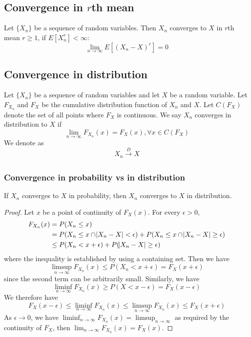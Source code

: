 \begin{refsection}
\subsection{Convergence in $r$th mean}
\begin{definition}\cite[308]{grimmett2001probability}
Let $\{X_n\}$ be a sequence of random variables. Then $X_n$ converges to $X$ in $r$th mean $r\geq 1$, if $E[X_n^r] < \infty$:
$$\lim_{n\rightarrow \infty }E[(X_n - X)^r] = 0$$
\end{definition}




\subsection{Convergence in distribution }
\begin{definition}
\cite[300]{hoggintroduction}Let $\{X_n\}$ be a sequence of random variables and let $X$ be a random variable. Let $F_{X_n}$ and $F_X$ be the cumulative distribution function of $X_n$ and $X$. Let $C(F_X)$ denote the set of all points where $F_X$ is continuous. We say $X_n$ converges in distribution to $X$ if
$$\lim_{n\rightarrow \infty} F_{X_n}(x) = F_X(x), \forall x\in C(F_X)$$We denote as 
$$X_n \xrightarrow[ ]{D} X $$
\end{definition}


\subsubsection{Convergence in probability vs in distribution}
\begin{theorem}\cite[304]{hoggintroduction}\cite[311]{grimmett2001probability}
If $X_n$ converges to $X$ in probability, then $X_n$ converges to $X$ in distribution. 
\end{theorem}
\begin{proof}
Let $x$ be a point of continuity of $F_X(x)$. For every $\epsilon > 0$, 
\begin{align*}
F_{X_n}(x) &= P(X_n \leq x) \\
&= P(X_n \leq x \cap \abs{X_n-X} < \epsilon) + P(X_n \leq x \cap \abs{X_n-X} \geq \epsilon) \\
&\leq P(X_n < x + \epsilon) + P(\abs{X_n-X} \geq \epsilon)
\end{align*}
where the inequality is established by using a containing set.
Then we have $$\limsup_{n\to\infty} F_{X_n}(x) \leq P(X_n < x + \epsilon) = F_X(x+\epsilon)$$ since the second term can be arbitrarily small. Similarly, we have $$\liminf_{n\to\infty} F_{X_n}(x) \geq P(X < x - \epsilon) = F_X(x-\epsilon)$$
We therefore have
$$F_X(x-\epsilon) \leq \liminf_{n\to\infty} F_{X_n}(x) \leq \limsup_{n\to\infty} F_{X_n}(x) \leq F_X(x+\epsilon)$$
As $\epsilon \to 0$, we have $\liminf_{n\to\infty} F_{X_n}(x) = \limsup_{n\to\infty}$
as required by the continuity of $F_X$, then $\lim_{n\to\infty} F_{X_n}(x) = F_X(x)$.	
\end{proof}



\end{refsection}
